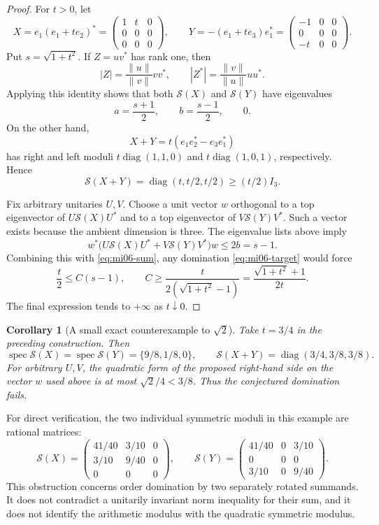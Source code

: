 \documentclass[10pt,a4paper]{article}
\newtheorem{corollary}[theorem]{Corollary}
\theoremstyle{remark}
\newcommand{\diag}{\operatorname{diag}}
\newcommand{\spec}{\operatorname{spec}}
\newcommand{\symmod}{\mathcal S}
\begin{document}
\begin{proof}
For $t>0$, let
\[
 X=e_1(e_1+te_2)^*
 =\begin{pmatrix}1&t&0\\0&0&0\\0&0&0\end{pmatrix},\qquad
 Y=-(e_1+te_3)e_1^*
 =\begin{pmatrix}-1&0&0\\0&0&0\\-t&0&0\end{pmatrix}.
\]
Put $s=\sqrt{1+t^2}$. If $Z=uv^*$ has rank one, then
\[
 |Z|=\frac{\|u\|}{\|v\|}vv^*,\qquad
 |Z^*|=\frac{\|v\|}{\|u\|}uu^*.
\]
Applying this identity shows that both $\symmod(X)$ and $\symmod(Y)$ have eigenvalues
\[
 a=\frac{s+1}{2},\qquad b=\frac{s-1}{2},\qquad0.
\]
On the other hand,
\[
 X+Y=t(e_1e_2^*-e_3e_1^*)
\]
has right and left moduli $t\diag(1,1,0)$ and $t\diag(1,0,1)$, respectively. Hence
\begin{equation}\label{eq:mi06-sum}
 \symmod(X+Y)=\diag(t,t/2,t/2)\geq(t/2)I_3.
\end{equation}

Fix arbitrary unitaries $U,V$. Choose a unit vector $w$ orthogonal to a top eigenvector of $U\symmod(X)U^*$ and to a top eigenvector of $V\symmod(Y)V^*$. Such a vector exists because the ambient dimension is three. The eigenvalue lists above imply
\[
 w^*\bigl(U\symmod(X)U^*+V\symmod(Y)V^*\bigr)w\leq 2b=s-1.
\]
Combining this with \eqref{eq:mi06-sum}, any domination \eqref{eq:mi06-target} would force
\[
 \frac t2\leq C(s-1),\qquad
 C\geq\frac{t}{2(\sqrt{1+t^2}-1)}
 =\frac{\sqrt{1+t^2}+1}{2t}.
\]
The final expression tends to $+\infty$ as $t\downarrow0$.
\end{proof}

\begin{corollary}[A small exact counterexample to $\sqrt2$]\label{cor:mi06-rational}
Take $t=3/4$ in the preceding construction. Then
\[
 \spec\symmod(X)=\spec\symmod(Y)=\{9/8,1/8,0\},
 \qquad \symmod(X+Y)=\diag(3/4,3/8,3/8).
\]
For arbitrary $U,V$, the quadratic form of the proposed right-hand side on the vector $w$ used above is at most $\sqrt2/4<3/8$. Thus the conjectured domination fails.
\end{corollary}

For direct verification, the two individual symmetric moduli in this example are rational matrices:
\[
 \symmod(X)=\begin{pmatrix}41/40&3/10&0\\3/10&9/40&0\\0&0&0\end{pmatrix},\qquad
 \symmod(Y)=\begin{pmatrix}41/40&0&3/10\\0&0&0\\3/10&0&9/40\end{pmatrix}.
\]
This obstruction concerns order domination by two separately rotated summands. It does not contradict a unitarily invariant norm inequality for their sum, and it does not identify the arithmetic modulus with the quadratic symmetric modulus.
\end{document}
